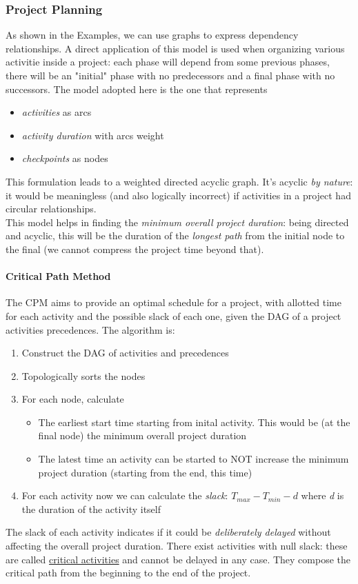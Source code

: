 \documentclass{article}
\begin{document}
			\subsubsection{Project Planning}
				As shown in the Examples, we can use graphs to express dependency relationships. A direct application of this model is used when organizing various activitie inside a project: each phase will depend from some previous phases, there will be an "initial" phase with no predecessors and a final phase with no successors. The model adopted here is the one that represents
				\begin{itemize}
					\item \textit{activities} as arcs
					\item \textit{activity duration} with arcs weight
					\item \textit{checkpoints} as nodes
				\end{itemize}
				This formulation leads to a weighted directed acyclic graph. It's acyclic \textit{by nature}: it would be meaningless (and also logically incorrect) if activities in a project had circular relationships.\\
				This model helps in finding the \textit{minimum overall project duration}: being directed and acyclic, this will be the duration of the \textit{longest path} from the initial node to the final (we cannot compress the project time beyond that).

				\paragraph{Critical Path Method}
					The CPM aims to provide an optimal schedule for a project, with allotted time for each activity and the possible slack of each one, given the DAG of a project activities precedences. The algorithm is:
					\begin{enumerate}
						\item Construct the DAG of activities and precedences
						\item Topologically sorts the nodes
						\item For each node, calculate
							\begin{itemize}
								\item The earliest start time starting from inital activity. This would be (at the final node) the minimum overall project duration
								\item The latest time an activity can be started to NOT increase the minimum project duration (starting from the end, this time)
							\end{itemize}
						\item For each activity now we can calculate the \textit{slack}: $T_{max} - T_{min} - d$ where \emph{d} is the duration of the activity itself
					\end{enumerate}
					The slack of each activity indicates if it could be \textit{deliberately delayed} without affecting the overall project duration. There exist activities with null slack: these are called \underline{critical activities} and cannot be delayed in any case. They compose the critical path from the beginning to the end of the project.
			
\end{document}
